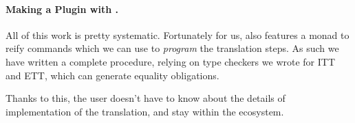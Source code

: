 \paragraph{Making a Plugin with \TemplateCoq.}
%
All of this work is pretty systematic. Fortunately for us,
\TemplateCoq also features a monad to reify \Coq commands which we can
use to \emph{program} the translation steps.
As such we have written a complete procedure, relying on type checkers we
wrote for ITT and ETT, which can generate equality obligations.

Thanks to this, the user doesn't have to know about the details of
implementation of the translation, and stay within the \Coq ecosystem.






